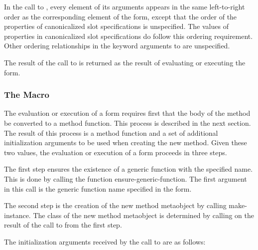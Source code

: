In the call to , every element of its arguments appears in the same
left-to-right order as the corresponding element of the  form, except
that the order of the properties of canonicalized slot specifications is
unspecified. The values of properties in canonicalized slot specifications do
follow this ordering requirement. Other ordering relationships in the keyword
arguments to  are unspecified. 

The result of the call to  is returned as the result of evaluating
or executing the  form. 

\subsubsection{The  Macro}

The evaluation or execution of a  form requires first that the body of
the method be converted to a method function. This process is described in the
next section. The result of this process is a method function and a set of
additional initialization arguments to be used when creating the new
method. Given these two values, the evaluation or execution of a  form
proceeds in three steps. 

The first step ensures the existence of a generic function with the specified
name. This is done by calling the function ensure-generic-function. The first
argument in this call is the generic function name specified in the 
form. 

The second step is the creation of the new method metaobject by calling
make-instance. The class of the new method metaobject is determined by calling
 on the result of the call to
 from the first step. 

The initialization arguments received by the call to  are as
follows: 


